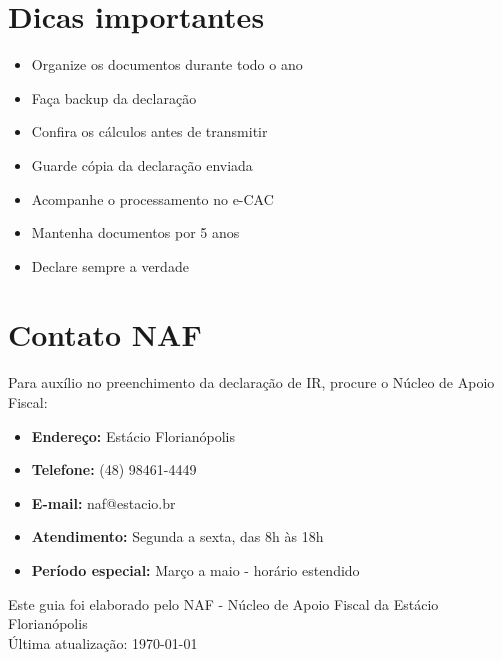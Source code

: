 \documentclass[12pt,a4paper]{article}
\begin{document}
\section{Dicas importantes}

\begin{itemize}
    \item Organize os documentos durante todo o ano
    \item Faça backup da declaração
    \item Confira os cálculos antes de transmitir
    \item Guarde cópia da declaração enviada
    \item Acompanhe o processamento no e-CAC
    \item Mantenha documentos por 5 anos
    \item Declare sempre a verdade
\end{itemize}

\section{Contato NAF}

Para auxílio no preenchimento da declaração de IR, procure o Núcleo de Apoio Fiscal:

\begin{itemize}
    \item \textbf{Endereço:} Estácio Florianópolis
    \item \textbf{Telefone:} (48) 98461-4449
    \item \textbf{E-mail:} naf@estacio.br
    \item \textbf{Atendimento:} Segunda a sexta, das 8h às 18h
    \item \textbf{Período especial:} Março a maio - horário estendido
\end{itemize}

\vfill
\begin{center}
\footnotesize
Este guia foi elaborado pelo NAF - Núcleo de Apoio Fiscal da Estácio Florianópolis\\
Última atualização: \today
\end{center}
\end{document}
